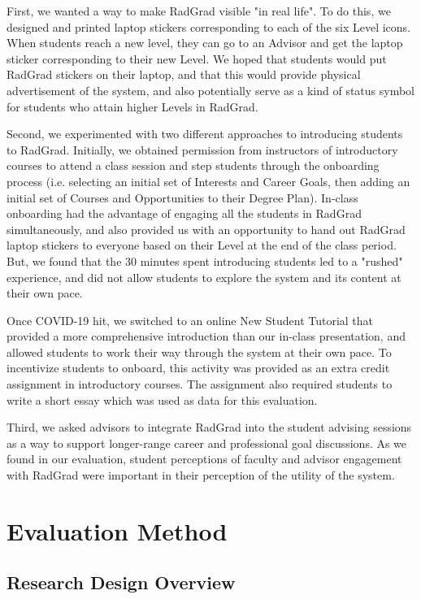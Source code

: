 \documentclass[acmsmall]{acmart}
\begin{document}
First, we wanted a way to make RadGrad visible "in real life".  To do this, we designed and printed laptop stickers corresponding to each of the six Level icons. When students reach a new level, they can go to an Advisor and get the laptop sticker corresponding to their new Level. We hoped that students would put RadGrad stickers on their laptop, and that this would provide physical advertisement of the system, and also potentially serve as a kind of status symbol for students who attain higher Levels in RadGrad.

Second, we experimented with two different approaches to introducing students to RadGrad. Initially, we obtained permission from instructors of introductory courses to attend a class session and step students through the onboarding process (i.e. selecting an initial set of Interests and Career Goals, then adding an initial set of Courses and Opportunities to their Degree Plan).  In-class onboarding had the advantage of engaging all the students in RadGrad simultaneously, and also provided us with an opportunity to hand out RadGrad laptop stickers to everyone based on their Level at the end of the class period.  But, we found that the 30 minutes spent introducing students led to a "rushed" experience, and did not allow students to explore the system and its content at their own pace.

Once COVID-19 hit, we switched to an online New Student Tutorial that provided a more comprehensive introduction than our in-class presentation, and allowed students to work their way through the system at their own pace.  To incentivize students to onboard, this activity was provided as an extra credit assignment in introductory courses.  The assignment also required students to write a short essay which was used as data for this evaluation.

Third, we asked advisors to integrate RadGrad into the student advising sessions as a way to support longer-range career and professional goal discussions.  As we found in our evaluation, student perceptions of faculty and advisor engagement with RadGrad were important in their perception of the utility of the system.

\section{Evaluation Method}
\label{sec:method}

\subsection{Research Design Overview}
\end{document}
